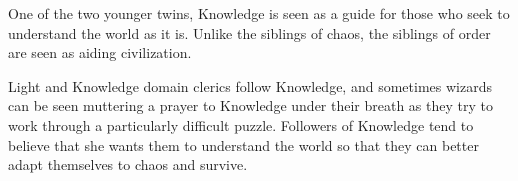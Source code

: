 One of the two younger twins, Knowledge is seen as a guide for those who seek to understand the world as it is.
Unlike the siblings of chaos, the siblings of order are seen as aiding civilization.

Light and Knowledge domain clerics follow Knowledge, and sometimes wizards can be seen muttering a prayer to Knowledge under their breath as they try to work through a particularly difficult puzzle.
Followers of Knowledge tend to believe that she wants them to understand the world so that they can better adapt themselves to chaos and survive.
